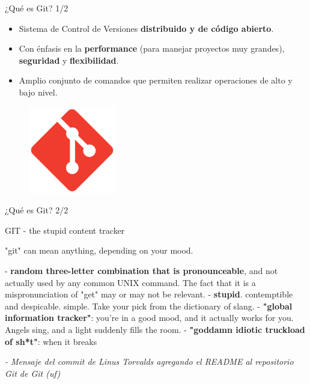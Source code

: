 \documentclass{beamer}
\begin{document}
\begin{frame}{¿Qué es Git? 1/2}

	\begin{block}{}
 \begin{itemize}
     	\item Sistema de Control de Versiones \textbf{distribuido y de código abierto}.
  
        \item Con énfasis en la \textbf{performance} (para manejar proyectos muy grandes), \textbf{seguridad} y \textbf{flexibilidad}.
        
        \item Amplio conjunto de comandos que permiten realizar operaciones de alto y bajo nivel.
 \end{itemize}

	\end{block}

    \begin{figure}[ht]
        \begin{center}
            \includegraphics[height=1.5in]{images/logo-git.pdf}
        \end{center}
    \end{figure}
\end{frame}

\begin{frame}{¿Qué es Git? 2/2}
    \begin{center}
        \begin{block}{GIT - the stupid content tracker}

            "git" can mean anything, depending on your mood.
            
             - \textbf{random three-letter combination that is pronounceable}, and not actually used by any common UNIX command.  The fact that it is a mispronunciation of "get" may or may not be relevant.\newline
             - \textbf{stupid}. contemptible and despicable. simple. Take your pick from the dictionary of slang.\newline
             - \textbf{"global information tracker"}: you're in a good mood, and it actually works for you. Angels sing, and a light suddenly fills the room. \newline
             - \textbf{"goddamn idiotic truckload of sh*t"}: when it breaks
        \end{block}
    \end{center}
    \pause
    \textit{ - Mensaje del commit de Linus Torvalds agregando el README al repositorio Git de Git (uf)}
    
\end{frame}
\end{document}
